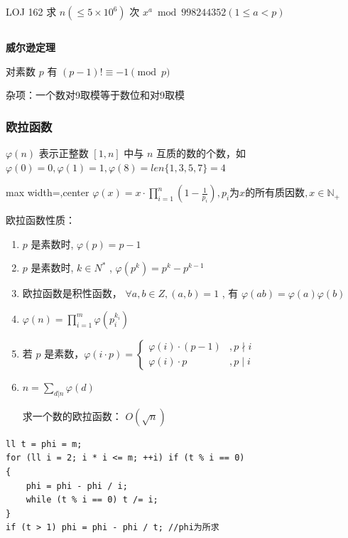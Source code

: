 \documentclass[twocolumn,10pt]{ctexart}
\makeatletter
\newcommand{\hfive}[1]{\par\addvspace{6pt}\@afterindentfalse
  {\noindent\bfseries\normalsize #1}\par\nobreak\vspace{2pt}}
\newcommand{\N}{\mathbb{N}}
\makeatother
\begin{document}
\begin{notebox}
LOJ 162 求 $n(\le5\times10^6)$ 次 $x^a\bmod 998244352(1 \le a < p)$
\end{notebox}

\inputminted{cpp}{code/ext_006.cpp}

\hfive{威尔逊定理}

对素数 $p$ 有 $(p-1)!\equiv -1\pmod p$

\begin{notebox}
杂项：一个数对9取模等于数位和对9取模
\end{notebox}

\subsubsection{欧拉函数}

$\varphi(n)$ 表示正整数 $[1,n]$ 中与 $n$ 互质的数的个数，如 $\varphi(0)=0,\allowbreak{}\varphi(1)=1,\allowbreak{}\varphi(8)=len\{1,\allowbreak{}3,\allowbreak{}5,\allowbreak{}7\}=4$

\begin{adjustbox}{max width=\linewidth,center}
$\varphi(x)=x\cdot\prod_{i=1}^n(1-\frac 1{p_i}),p_i\text{为}x\text{的所有质因数},x\in\N_+$
\end{adjustbox}

欧拉函数性质：

\begin{enumerate}
\item $p$ 是素数时,  $\varphi(p)=p-1$
\item $p$ 是素数时,  $k\in N^*$ , $\varphi(p^k)=p^k-p^{k-1}$
\item 欧拉函数是积性函数， $\forall a,b\in Z,(a,b)=1$ , 有 $\varphi(ab)=\varphi(a)\varphi(b)$
\item $\varphi(n)=\prod_{i=1}^m\varphi(p_i^{k_i})$
\item 若 $p$ 是素数，$\varphi(i\cdot p)=\begin{cases}\varphi(i)\cdot(p-1)&,p\nmid i\\\varphi(i)\cdot p&,p\mid i\end{cases}$
\item $n=\sum_{d|n}\varphi(d)$

求一个数的欧拉函数： $O(\sqrt n)$
\end{enumerate}

\begin{verbatim}
ll t = phi = m;
for (ll i = 2; i * i <= m; ++i) if (t % i == 0)
{
    phi = phi - phi / i;
    while (t % i == 0) t /= i;
}
if (t > 1) phi = phi - phi / t; //phi为所求
\end{verbatim}
\end{document}

